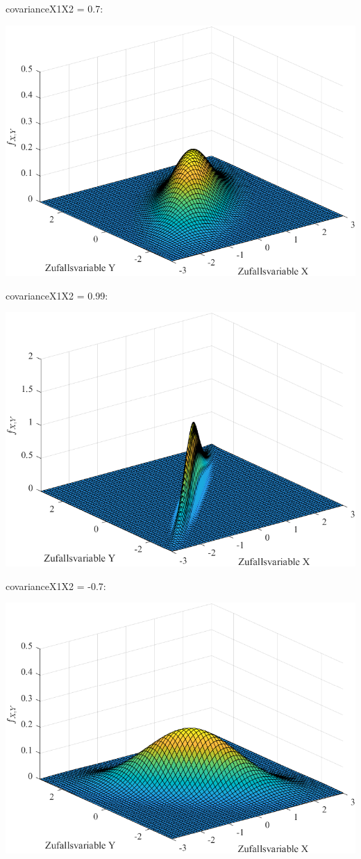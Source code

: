 \documentclass[a4paper]{scrartcl}
\begin{document}
covarianceX1X2 = 0.7:
\begin{center}
	\includegraphics*[scale = 0.5]{question3b1.png}
\end{center}
covarianceX1X2 = 0.99:
\begin{center}
	\includegraphics*[scale = 0.5]{question3b2.png}
\end{center}
covarianceX1X2 = -0.7:
\begin{center}
	\includegraphics*[scale = 0.5]{question3b3.png}
\end{center}
\end{document}
